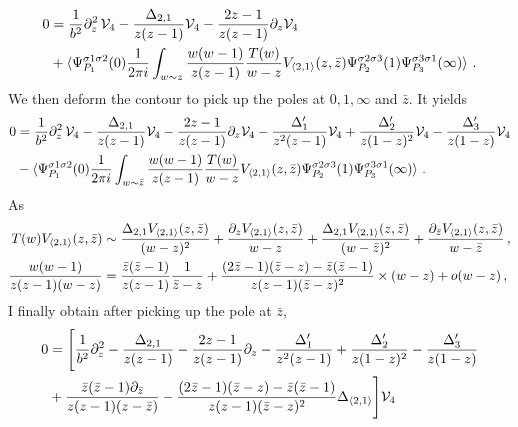 \documentclass[a4paper]{article}
\begin{document}
\begin{equation}
\begin{aligned}
  0&=\frac{1}{b^2}\partial_z^2\,\mathcal{V}_{4}-\frac{\Delta_{2,1}}{z(z-1)}\mathcal{V}_{4}-\frac{2z-1}{z(z-1)}\partial_z \mathcal{V}_{4}\\
  &+\braket{\Psi_{P_1}^{\sigma 1 \sigma 2}(0)\frac{1}{2\pi i}\int_{w \sim z}\frac{w(w-1)}{z(z-1)}\frac{T(w)}{w-z} V_{\braket{2,1}}(z,\bar{z})\Psi_{P_2}^{\sigma 2 \sigma 3}(1)\Psi_{P_3}^{\sigma 3 \sigma 1}(\infty)}\,.
\end{aligned}
\end{equation}
We then deform the contour to pick up the poles at $0,1,\infty$ and $\bar{z}$. It yields
\begin{equation}
\begin{aligned}
  0&=\frac{1}{b^2}\partial_z^2\,\mathcal{V}_{4}-\frac{\Delta_{2,1}}{z(z-1)}\mathcal{V}_{4}-\frac{2z-1}{z(z-1)}\partial_z \mathcal{V}_{4}-\frac{\Delta_1'}{z^2(z-1)}\mathcal{V}_{4}+\frac{\Delta_2'}{z(1-z)^2}\mathcal{V}_{4}-\frac{\Delta'_3}{z(1-z)}\mathcal{V}_{4}\\
  &-\braket{\Psi_{P_1}^{\sigma 1 \sigma 2}(0)\frac{1}{2\pi i}\int_{w \sim \bar{z}}\frac{w(w-1)}{z(z-1)}\frac{T(w)}{w-z} V_{\braket{2,1}}(z,\bar{z})\Psi_{P_2}^{\sigma 2 \sigma 3}(1)\Psi_{P_3}^{\sigma 3 \sigma 1}(\infty)}\,.
\end{aligned}
\end{equation}
As 
\begin{equation}
\begin{aligned}
  T(w)V_{\braket{2,1}}(z,\bar{z}) &\sim \frac{\Delta_{2,1}V_{\braket{2,1}}(z,\bar{z})}{(w-z)^2}+\frac{\partial_zV_{\braket{2,1}}(z,\bar{z})}{w-z}+\frac{\Delta_{2,1}V_{\braket{2,1}}(z,\bar{z})}{(w-\bar{z})^2}+\frac{\partial_{\bar{z}}V_{\braket{2,1}}(z,\bar{z})}{w-\bar{z}}\,,\\
  \frac{w(w-1)}{z(z-1)(w-z)}&=\frac{\bar{z}(\bar{z}-1)}{z(z-1)}\frac{1}{\bar{z}-z}+\frac{(2\bar{z}-1)(\bar{z}-z)-\bar{z}(\bar{z}-1)}{z(z-1)(\bar{z}-z)^2}\times (w-z)+o(w-z)\,,
\end{aligned}
\end{equation}
I finally obtain after picking up the pole at $\bar{z}$, 
\begin{equation}
\begin{aligned}
  0&=\Bigg[\frac{1}{b^2}\partial_z^2-\frac{\Delta_{2,1}}{z(z-1)}-\frac{2z-1}{z(z-1)}\partial_z -\frac{\Delta_1'}{z^2(z-1)}+\frac{\Delta_2'}{z(1-z)^2}-\frac{\Delta'_3}{z(1-z)}\\
  &+\frac{\bar{z}(\bar{z}-1)\partial_{\bar{z}}}{z(z-1)(z-\bar{z})}-\frac{(2\bar{z}-1)(\bar{z}-z)-\bar{z}(\bar{z}-1)}{z(z-1)(\bar{z}-z)^2}\Delta_{\braket{2,1}}\Bigg]\mathcal{V}_{4}
\end{aligned}
\end{equation}
\end{document}

